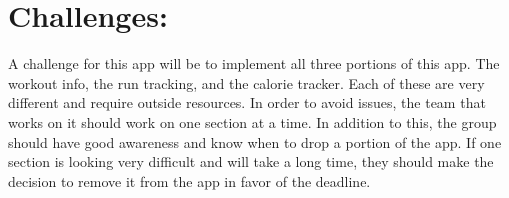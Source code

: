 \documentclass[12pt]{article}
\begin{document}
\section*{Challenges:}
A challenge for this app will be to implement all three portions of this app. The workout info, the run tracking, and the calorie tracker. Each of these are very different and require outside resources. In order to avoid issues, the team that works on it should work on one section at a time. In addition to this, the group should have good awareness and know when to drop a portion of the app. If one section is looking very difficult and will take a long time, they should make the decision to remove it from the app in favor of the deadline.
\end{document}

